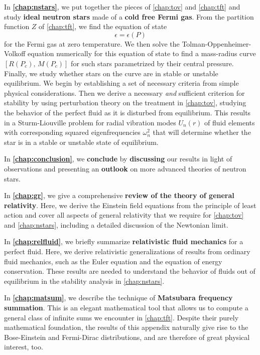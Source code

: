 In \textbf{\cref{chap:nstars}}, we put together the pieces of \cref{chap:tov} and \cref{chap:tft} and study \textbf{ideal neutron stars} made of a \textbf{cold free Fermi gas}.
From the partition function $Z$ of \cref{chap:tft}, we find the equation of state
\begin{equation*}
	\epsilon = \epsilon(P)
\end{equation*}
for the Fermi gas at zero temperature.
We then solve the Tolman-Oppenheimer-Volkoff equation numerically for this equation of state to find a mass-radius curve $[R(P_c), \, M(P_c)]$ for such stars parametrized by their central pressure.
Finally, we study whether stars on the curve are in stable or unstable equilibrium.
We begin by establishing a set of necessary criteria from simple physical considerations.
Then we derive a necessary \emph{and} sufficient criterion for stability by using perturbation theory on the treatment in \cref{chap:tov}, studying the behavior of the perfect fluid as it is disturbed from equilibrium.
This results in a Sturm-Liouville problem for radial vibration modes $U_n(r)$ of fluid elements with corresponding squared eigenfrequencies $\omega_n^2$ that will determine whether the star is in a stable or unstable state of equilibrium.

In \textbf{\cref{chap:conclusion}}, we \textbf{conclude} by \textbf{discussing} our results in light of observations and presenting an \textbf{outlook} on more advanced theories of neutron stars.

In \textbf{\cref{chap:gr}}, we give a comprehensive \textbf{review of the theory of general relativity}.
Here, we derive the Einstein field equations from the principle of least action and cover all aspects of general relativity that we require for \cref{chap:tov} and \cref{chap:nstars}, including a detailed discussion of the Newtonian limit.

In \textbf{\cref{chap:relfluid}}, we briefly summarize \textbf{relativistic fluid mechanics} for a perfect fluid.
Here, we derive relativistic generalizations of results from ordinary fluid mechanics, such as the Euler equation and the equation of energy conservation.
These results are needed to understand the behavior of fluids out of equilibrium in the stability analysis in \cref{chap:nstars}.

In \textbf{\cref{chap:matsum}}, we describe the technique of \textbf{Matsubara frequency summation}.
This is an elegant mathematical tool that allows us to compute a general class of infinite sums we encounter in \cref{chap:tft}.
Despite their purely mathematical foundation, the results of this appendix naturally give rise to the Bose-Einstein and Fermi-Dirac distributions, and are therefore of great physical interest, too.

